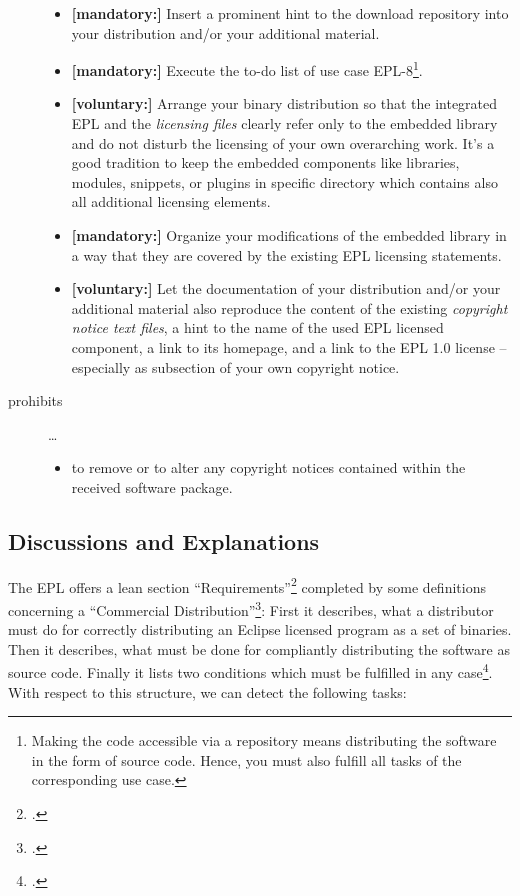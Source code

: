 \begin{description}
\begin{itemize}
  \item \textbf{[mandatory:]} Insert a prominent hint to the download repository
  into your distribution and/or your additional material.
  
  \item \textbf{[mandatory:]} Execute the to-do list of use case EPL-8\footnote{
  Making the code accessible via a repository means distributing the software in
  the form of source code. Hence, you must also fulfill all tasks of the
  corresponding use case.}.
  
  \item \textbf{[voluntary:]} Arrange your binary distribution so that the
  integrated EPL and the \emph{licensing files} clearly refer only to the
  embedded library and do not disturb the licensing of your own overarching
  work. It's a good tradition to keep the embedded components like libraries,
  modules, snippets, or plugins in specific directory which contains also all
  additional licensing elements.
  
  \item \textbf{[mandatory:]} Organize your modifications of the embedded
  library in a way that they are covered by the existing EPL licensing
  statements. 
  
  \item \textbf{[voluntary:]} Let the documentation of your distribution and/or
  your additional material  also reproduce the content of the existing
  \emph{copyright notice text files}, a hint to the name of the used EPL
  licensed component, a link to its homepage, and a link to the EPL 1.0 license
  -- especially as subsection of your own copyright notice.
  
\end{itemize}

\item[prohibits] \ldots
\begin{itemize}
  \item to remove or to alter any copyright notices contained within the
  received software package.
\end{itemize}

\end{description}

\subsection{Discussions and Explanations}

The EPL offers a lean section
\enquote{Requirements}\footcite[cf.][\nopage wp\ §3]{Epl10OsiLicense2005a}
completed by some definitions concerning a \enquote{Commercial
Distribution}\footcite[cf.][\nopage wp\ §4]{Epl10OsiLicense2005a}: First it
describes, what a distributor must do for correctly distributing an Eclipse
licensed program as a set of binaries. Then it describes, what must be done for
compliantly distributing the software as source code. Finally it lists two
conditions which must be fulfilled in any case\footcite[cf.][\nopage wp\
§3]{Epl10OsiLicense2005a}. With respect to this structure, we can detect the
following tasks:

